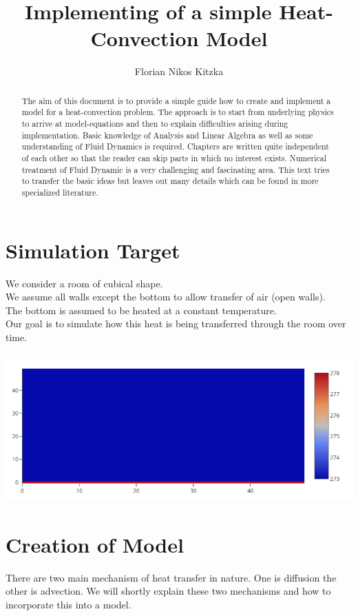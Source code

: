 \documentclass[]{article}
\title{Implementing of a simple Heat-Convection Model}
\author{Florian Nikos Kitzka}
\begin{document}
\maketitle

\begin{abstract}
The aim of this document is to provide a simple guide how to create and implement a model for a heat-convection problem. The approach is to start from underlying physics to arrive at model-equations and then to explain difficulties arising during implementation. Basic knowledge of Analysis and Linear Algebra as well as some understanding of 
Fluid Dynamics is required. Chapters are written quite independent of each other so that the reader
can skip parts in which no interest exists. Numerical treatment of Fluid Dynamic is a very challenging and fascinating area. This text tries to transfer the basic ideas but leaves out many details which can be found in more specialized literature.
\end{abstract}

\tableofcontents

\section{Simulation Target}
We consider a room of cubical shape.\\
We assume all walls except the bottom to allow transfer of air (open walls).\\
The bottom is assumed to be heated at a constant temperature.\\
Our goal is to simulate how this heat is being transferred through the room over time.

\includegraphics{setup}

\section{Creation of Model} \label{model_creation}
There are two main mechanism of heat transfer in nature. One is diffusion the other is advection. We will shortly explain these two mechanisms and how to incorporate this into a model.\\
\end{document}

